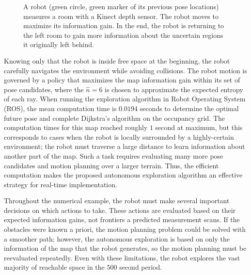 \documentclass[letterpaper, 10pt, conference]{ieeeconf}
\begin{document}
\begin{figure}
{{	}
}
\caption{A robot (green circle, green marker of its previous pose locations) measures a room with a Kinect depth sensor. The robot moves to maximize its information gain. In the end, the robot is returning to the left room to gain more information about the uncertain regions it originally left behind.%
}
\label{fig:AutonomousExploration}
\end{figure}

Knowing only that the robot is inside free space at the beginning, the robot carefully navigates the environment while avoiding collisions. The robot motion is governed by a policy that maximizes the map information gain within its set of pose candidates, where the $\hat n=6$ is chosen to approximate the expected entropy of each ray. 
When running the exploration algorithm in Robot Operating System (ROS), the mean computation time is $0.0194$ seconds to determine the optimal future pose and complete Dijkstra's algorithm on the occupancy grid.
The computation times for this map reached roughly $1$ second at maximum, but this corresponds to cases when the robot is locally surrounded by a highly-certain environment; the robot must traverse a large distance to learn information about another part of the map. Such a task requires evaluating many more pose candidates and motion planning over a larger terrain. Thus, the efficient computation makes the proposed autonomous exploration algorithm an effective strategy for real-time implementation.

Throughout the numerical example, the robot must make several important decisions on which actions to take. These actions are evaluated based on their expected information gains, not frontiers a predicted measurement scans. If the obstacles were known a priori, the motion planning problem could be solved with a smoother path; however, the autonomous exploration is based on only the information of the map that the robot generates, so the motion planning must be reevaluated repeatedly. Even with these limitations, the robot explores the vast majority of reachable space in the $500$ second period. 
\end{document}
